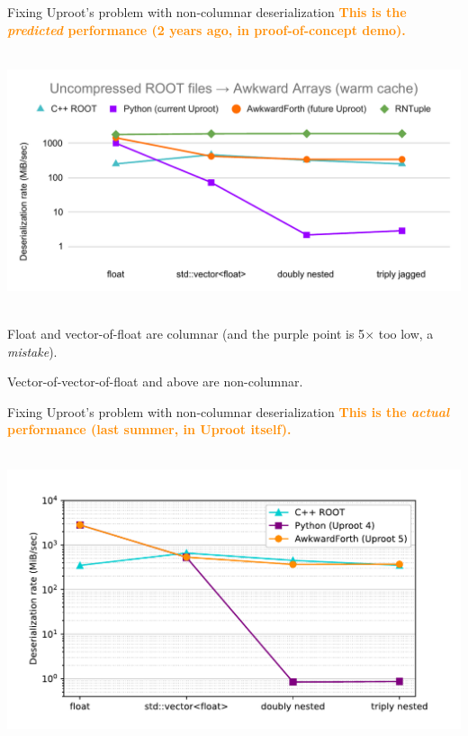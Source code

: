 \documentclass[aspectratio=169]{beamer}
\begin{document}
\begin{frame}{Fixing Uproot's problem with non-columnar deserialization}
\vspace{0.25 cm}
\textcolor{darkorange}{\bf \centering This is the {\it predicted} performance (2 years ago, in proof-of-concept demo).}

\mbox{ } \hfill \includegraphics[width=0.9\linewidth]{PLOTS/AwkwardForth-performance-ROOT.pdf} \hfill \mbox{ }

Float and vector-of-float are columnar (and the purple point is 5$\times$ too low, a {\it mistake}).

Vector-of-vector-of-float and above are non-columnar.
\end{frame}

\begin{frame}{Fixing Uproot's problem with non-columnar deserialization}
\vspace{0.25 cm}
\textcolor{darkorange}{\bf \centering This is the {\it actual} performance (last summer, in Uproot itself).}

\mbox{ } \hfill \includegraphics[width=0.9\linewidth]{PLOTS/awkwardforth-in-uproot-performance.pdf} \hfill \mbox{ }
\end{frame}
\end{document}
